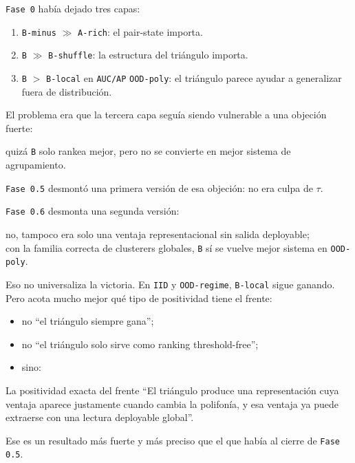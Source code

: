 \documentclass[11pt]{article}
\begin{document}
\texttt{Fase 0} había dejado tres capas:

\begin{enumerate}
  \item \texttt{B-minus} $\gg$ \texttt{A-rich}: el pair-state importa.
  \item \texttt{B} $\gg$ \texttt{B-shuffle}: la estructura del triángulo importa.
  \item \texttt{B} $>$ \texttt{B-local} en \texttt{AUC/AP} \texttt{OOD-poly}: el triángulo parece ayudar a generalizar fuera de distribución.
\end{enumerate}

El problema era que la tercera capa seguía siendo vulnerable a una objeción fuerte:

\begin{quietbox}
quizá \texttt{B} solo rankea mejor, pero no se convierte en mejor sistema de agrupamiento.
\end{quietbox}

\texttt{Fase 0.5} desmontó una primera versión de esa objeción: no era culpa de $\tau$.

\texttt{Fase 0.6} desmonta una segunda versión:

\begin{quietbox}
no, tampoco era solo una ventaja representacional sin salida deployable;\\
con la familia correcta de clusterers globales, \texttt{B} sí se vuelve mejor sistema en \texttt{OOD-poly}.
\end{quietbox}

Eso no universaliza la victoria. En \texttt{IID} y \texttt{OOD-regime}, \texttt{B-local} sigue ganando. Pero acota mucho mejor qué tipo de positividad tiene el frente:

\begin{itemize}
  \item no ``el triángulo siempre gana'';
  \item no ``el triángulo solo sirve como ranking threshold-free'';
  \item sino:
\end{itemize}

\begin{keybox}{La positividad exacta del frente}
``El triángulo produce una representación cuya ventaja aparece justamente cuando cambia la polifonía, y esa ventaja ya puede extraerse con una lectura deployable global''.
\end{keybox}

Ese es un resultado más fuerte y más preciso que el que había al cierre de \texttt{Fase 0.5}.
\end{document}

